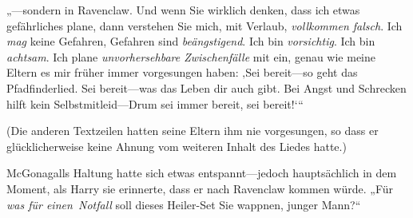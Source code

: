 „—sondern in Ravenclaw. Und wenn Sie wirklich denken, dass ich etwas gefährliches plane, dann verstehen Sie mich, mit Verlaub, \emph{vollkommen falsch}. Ich \emph{mag} keine Gefahren, Gefahren sind \emph{beängstigend}. Ich bin \emph{vorsichtig}. Ich bin \emph{achtsam}. Ich plane \emph{unvorhersehbare Zwischenfälle} mit ein, genau wie meine Eltern es mir früher immer vorgesungen haben: ‚Sei bereit—so geht das Pfadfinderlied. Sei bereit—was das Leben dir auch gibt. Bei Angst und Schrecken hilft kein Selbstmitleid—Drum sei immer bereit, sei bereit!‘“

(Die anderen Textzeilen hatten seine Eltern ihm nie vorgesungen, so dass er glücklicherweise keine Ahnung vom weiteren Inhalt des Liedes hatte.)

McGonagalls Haltung hatte sich etwas entspannt—jedoch hauptsächlich in dem Moment, als Harry sie erinnerte, dass er nach Ravenclaw kommen würde. „Für \emph{was für einen\linebreak\ Notfall} soll dieses Heiler-Set Sie wappnen, junger Mann?“

